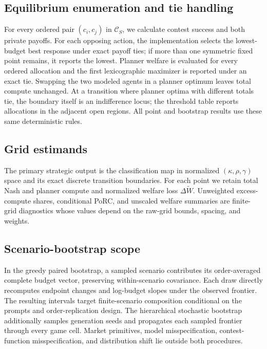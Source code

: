 \documentclass{article}
\begin{document}
\subsection{Equilibrium enumeration and tie handling}
For every ordered pair $(c_i,c_j)$ in $\mathcal C_S$, we calculate contest success and both private payoffs. For each opposing action, the implementation selects the lowest-budget best response under exact payoff ties; if more than one symmetric fixed point remains, it reports the lowest. Planner welfare is evaluated for every ordered allocation and the first lexicographic maximizer is reported under an exact tie. Swapping the two modeled agents in a planner optimum leaves total compute unchanged. At a transition where planner optima with different totals tie, the boundary itself is an indifference locus; the threshold table reports allocations in the adjacent open regions. All point and bootstrap results use these same deterministic rules.

\subsection{Grid estimands}
The primary strategic output is the classification map in normalized $(\kappa,\rho,\gamma)$ space and its exact discrete transition boundaries. For each point we retain total Nash and planner compute and normalized welfare loss $\Delta\widetilde W$. Unweighted excess-compute shares, conditional PoRC, and unscaled welfare summaries are finite-grid diagnostics whose values depend on the raw-grid bounds, spacing, and weights.

\subsection{Scenario-bootstrap scope}
In the greedy paired bootstrap, a sampled scenario contributes its order-averaged complete budget vector, preserving within-scenario covariance. Each draw directly recomputes endpoint changes and log-budget slopes under the observed frontier. The resulting intervals target finite-scenario composition conditional on the prompts and order-replication design. The hierarchical stochastic bootstrap additionally samples generation seeds and propagates each sampled frontier through every game cell. Market primitives, model misspecification, contest-function misspecification, and distribution shift lie outside both procedures.
\end{document}
